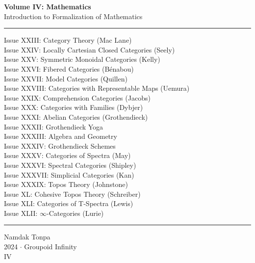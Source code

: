 \documentclass{article}
\begin{document}
\begin{titlepage}
    \centering
    \vspace*{0.5in}
    \Huge
    \textbf{Volume IV: Mathematics} \\
    \LARGE
    Introduction to Formalization of Mathematics \\
    \vspace{1.5in}
    \rule{\textwidth}{0.4pt}
    \small
    \flushleft
    Issue XXIII: Category Theory (Mac Lane) \\
    Issue XXIV: Locally Cartesian Closed Categories (Seely) \\
    Issue XXV: Symmetric Monoidal Categories (Kelly) \\
    Issue XXVI: Fibered Categories (Bénabou) \\
    Issue XXVII: Model Categories (Quillen) \\
    Issue XXVIII: Categories with Representable Maps (Uemura) \\
    Issue XXIX: Comprehension Categories (Jacobs) \\
    Issue XXX: Categories with Families (Dybjer) \\
    Issue XXXI: Abelian Categories (Grothendieck) \\
    Issue XXXII: Grothendieck Yoga \\
    Issue XXXIII: Algebra and Geometry \\
    Issue XXXIV: Grothendieck Schemes \\
    Issue XXXV: Categories of Spectra (May) \\
    Issue XXXVI: Spectral Categories (Shipley) \\
    Issue XXXVII: Simplicial Categories (Kan) \\
    Issue XXXIX: Topos Theory (Johnstone) \\
    Issue XL: Cohesive Topos Theory (Schreiber) \\
    Issue XLI: Categories of T-Spectra (Lewis) \\
    Issue XLII: $\infty$-Categories (Lurie) \\
    \rule{\textwidth}{0.4pt}
    \centering
    \vfill
    \large
    Namdak Tonpa \\
    \Large
    2024 $\cdot$ Groupoid Infinity \\
    IV
\end{titlepage}
\end{document}
